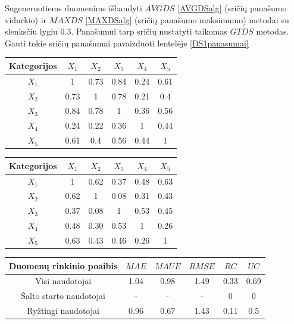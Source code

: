 \documentclass{VUMIFInfMagistrinis}
\begin{document}
Sugeneruotiems duomenims išbandyti $AVGDS$ \ref{AVGDSalg} (sričių panašumo vidurkio) ir $MAXDS$ \ref{MAXDSalg} (sričių panašumo maksimumo) metodai su slenksčiu lygiu 0.3. Panašumui tarp sričių nustatyti taikomas $GTDS$ metodas. Gauti tokie sričių panašumai pavaizduoti lentelėje \ref{DS1panasumai}
\begin{center}
	\begin{tabular}{||c c c c c c||} 
		\hline
		Kategorijos & $X_1$ & $X_2$ & $X_3$ & $X_4$ & $X_5$ \\ [0.5ex] 
		\hline\hline
		$X_1$ & 1 & 0.73 & 0.84 & 0.24 & 0.61 \\ 
		\hline
		$X_2$ & 0.73 & 1 & 0.78 & 0.21 & 0.4 \\
		\hline
		$X_3$ & 0.84 & 0.78 & 1 & 0.36 & 0.56 \\
		\hline
		$X_4$ & 0.24 & 0.22 & 0.36 & 1 & 0.44 \\
		\hline
		$X_5$ & 0.61 & 0.4 & 0.56 & 0.44 & 1 \\
		\hline
	\end{tabular}\label{DS1panasumai}
\end{center}

\begin{center}
	\begin{tabular}{||c c c c c c||} 
		\hline
		Kategorijos & $X_1$ & $X_2$ & $X_3$ & $X_4$ & $X_5$ \\ [0.5ex] 
		\hline\hline
		$X_1$ & 1 & 0.62 & 0.37 & 0.48 & 0.63 \\ 
		\hline
		$X_2$ & 0.62 & 1 & 0.08 & 0.31 & 0.43 \\
		\hline
		$X_3$ & 0.37 & 0.08 & 1 & 0.53 & 0.45 \\
		\hline
		$X_4$ & 0.48 & 0.30 & 0.53 & 1 & 0.26 \\
		\hline
		$X_5$ & 0.63 & 0.43 & 0.46 & 0.26 & 1 \\
		\hline
	\end{tabular}\label{DS1koreliacijos}
\end{center}
\begin{center}
	\begin{tabular}{||c c c c c c ||} 
		Duomenų rinkinio poaibis &  $MAE$ & $MAUE$ & $RMSE$ & $RC$ & $UC$ \\
		\hline
		Visi naudotojai & 1.04 & 0.98 & 1.49 & 0.33 & 0.69 \\
		\hline
		Šalto starto naudotojai  & - & - & - & 0 & 0 \\
		\hline
		Ryžtingi naudotojai  & 0.96 & 0.67 & 1.43 & 0.11 & 0.5 \\
	\end{tabular}
\end{center}
\end{document}
